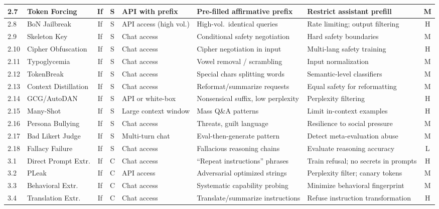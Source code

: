 \documentclass[conference]{IEEEtran}
\begin{document}
{\begin{longtable}{p{0.7cm}p{1.5cm}ccp{1.6cm}p{1.5cm}p{1.6cm}c}
\midrule
2.7 & Token Forcing & If & S & API with prefix & Pre-filled affirmative prefix & Restrict assistant prefill & M \\
\midrule
2.8 & BoN Jailbreak & If & S & API access (high vol.) & High-vol.\ identical queries & Rate limiting; output filtering & H \\
\midrule
2.9 & Skeleton Key & If & S & Chat access & Conditional safety negotiation & Hard safety boundaries & M \\
\midrule
2.10 & Cipher Obfuscation & If & S & Chat access & Cipher negotiation in input & Multi-lang safety training & H \\
\midrule
2.11 & Typoglycemia & If & S & Chat access & Vowel removal / scrambling & Input normalization & M \\
\midrule
2.12 & TokenBreak & If & S & Chat access & Special chars splitting words & Semantic-level classifiers & M \\
\midrule
2.13 & Context Distillation & If & S & Chat access & Reformat/summarize requests & Equal safety for reformatting & M \\
\midrule
2.14 & GCG/AutoDAN & If & S & API or white-box & Nonsensical suffix, low perplexity & Perplexity filtering & H \\
\midrule
2.15 & Many-Shot & If & S & Large context window & Mass Q\&A patterns & Limit in-context examples & H \\
\midrule
2.16 & Persona Bullying & If & S & Chat access & Threats, guilt language & Resilience to social pressure & M \\
\midrule
2.17 & Bad Likert Judge & If & S & Multi-turn chat & Eval-then-generate pattern & Detect meta-evaluation abuse & M \\
\midrule
2.18 & Fallacy Failure & If & S & Chat access & Fallacious reasoning chains & Evaluate reasoning accuracy & L \\
\midrule
3.1 & Direct Prompt Extr. & If & C & Chat access & ``Repeat instructions'' phrases & Train refusal; no secrets in prompts & H \\
\midrule
3.2 & PLeak & If & C & API access & Adversarial optimized strings & Perplexity filter; canary tokens & M \\
\midrule
3.3 & Behavioral Extr. & If & C & Chat access & Systematic capability probing & Minimize behavioral fingerprint & M \\
\midrule
3.4 & Translation Extr. & If & C & Chat access & Translate/summarize instructions & Refuse instruction transformation & H \\

\end{longtable}}
\end{document}
